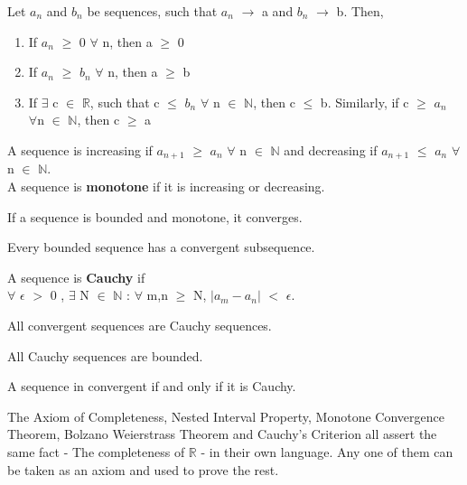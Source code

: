 \documentclass{report}
\begin{document}
\begin{theorem}
Let $a_n$ and $b_n$ be sequences, such that $a_n$ $\rightarrow$ a and $b_n$ $\rightarrow$ b. Then,
\begin{enumerate}
\item If $a_n$ $\geq$ 0 $\forall$ n, then a $\geq$ 0
\item If $a_n$ $\geq$ $b_n$ $\forall$ n, then a $\geq$ b
\item If $\exists$ c $\in$ $\mathbb{R}$, such that c $\leq$ $b_n$ $\forall$ n $\in$ $\mathbb{N}$, then c $\leq$ b. Similarly, if c $\geq$ $a_n$ \\ $\forall$n $\in$ $\mathbb{N}$, then c $\geq$ a
\end{enumerate}
\end{theorem}
\begin{definition}
A sequence is increasing if $a_{n+1}$ $\geq$ $a_n$ $\forall$ n $\in$ $\mathbb{N}$ and decreasing if  $a_{n+1}$ $\leq$ $a_n$ $\forall$ n $\in$ $\mathbb{N}$. \\
A sequence is \textbf{monotone} if it is increasing or decreasing.
\end{definition}

\begin{theorem}
If a sequence is bounded and monotone, it converges.
\end{theorem}

\begin{theorem}
Every bounded sequence has a convergent subsequence.
\end{theorem}

\begin{definition}
A sequence is \textbf{Cauchy} if\\
$\forall$ $\epsilon$ $>$ 0 , $\exists$ N $\in$ $\mathbb{N}$ : $\forall$ m,n $\geq$ N, $\lvert a_m - a_n \rvert$ $<$ $\epsilon$.
\end{definition}

\begin{theorem}
All convergent sequences are Cauchy sequences.
\end{theorem}

\begin{theorem}
All Cauchy sequences are bounded.
\end{theorem}

\begin{theorem}
A sequence in convergent if and only if it is Cauchy.
\end{theorem}
The Axiom of Completeness, Nested Interval Property, Monotone Convergence Theorem, Bolzano Weierstrass Theorem and Cauchy's Criterion all assert the same fact - The completeness of $\mathbb{R}$ - in their own language. Any one of them can be taken as an axiom and used to prove the rest.
\end{document}
